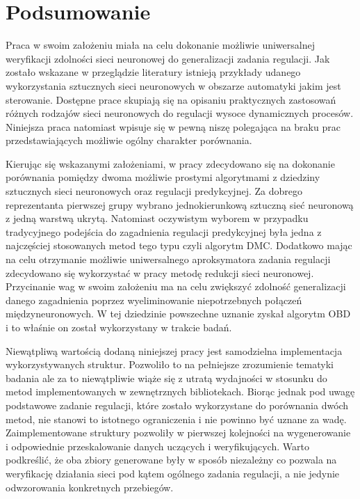 \newpage %
\section{Podsumowanie}
\par Praca w swoim założeniu miała na celu dokonanie możliwie uniwersalnej weryfikacji zdolności sieci neuronowej do generalizacji zadania regulacji. Jak zostało wskazane w przeglądzie literatury istnieją przykłady udanego wykorzystania sztucznych sieci neuronowych w obszarze automatyki jakim jest sterowanie. Dostępne prace skupiają się na opisaniu praktycznych zastosowań różnych rodzajów sieci neuronowych do regulacji wysoce dynamicznych procesów. Niniejsza praca natomiast wpisuje się w pewną niszę polegająca na braku prac przedstawiających możliwie ogólny charakter porównania. 
\par Kierując się wskazanymi założeniami, w pracy zdecydowano się na dokonanie porównania pomiędzy dwoma możliwie prostymi algorytmami z dziedziny sztucznych sieci neuronowych oraz regulacji predykcyjnej. Za dobrego reprezentanta pierwszej grupy wybrano jednokierunkową sztuczną sieć neuronową z jedną warstwą ukrytą. Natomiast oczywistym wyborem w przypadku tradycyjnego podejścia do zagadnienia regulacji predykcyjnej była jedna z najczęściej stosowanych metod tego typu czyli algorytm DMC. Dodatkowo mając na celu otrzymanie możliwie uniwersalnego aproksymatora zadania regulacji zdecydowano się wykorzystać w pracy metodę redukcji sieci neuronowej. Przycinanie wag w swoim założeniu ma na celu zwiększyć zdolność generalizacji danego zagadnienia poprzez wyeliminowanie niepotrzebnych połączeń międzyneuronowych. W tej dziedzinie powszechne uznanie zyskał algorytm OBD i to właśnie on został wykorzystany w trakcie badań. 
\par Niewątpliwą wartością dodaną niniejszej pracy jest samodzielna implementacja wykorzystywanych struktur. Pozwoliło to na pełniejsze zrozumienie tematyki badania ale za to niewątpliwie wiąże się z utratą wydajności w stosunku do metod implementowanych w zewnętrznych bibliotekach. Biorąc jednak pod uwagę podstawowe zadanie regulacji, które zostało wykorzystane do porównania dwóch metod, nie stanowi to istotnego ograniczenia i nie powinno być uznane za wadę. Zaimplementowane struktury pozwoliły w pierwszej kolejności na wygenerowanie i odpowiednie przeskalowanie danych uczących i weryfikujących. Warto podkreślić, że oba zbiory generowane były w sposób niezależny co pozwala na weryfikację działania sieci pod kątem ogólnego zadania regulacji, a nie jedynie odwzorowania konkretnych przebiegów.
